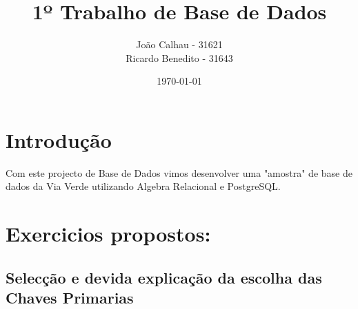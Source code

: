 \documentclass[a4paper]{article}
\title{1º Trabalho de Base de Dados}
\author{João Calhau - 31621 \\ Ricardo Benedito - 31643}
\date{\today}
\begin{document}
\maketitle

\section{Introdução}

Com este projecto de Base de Dados vimos desenvolver uma "amostra" de base de dados da Via Verde utilizando Algebra Relacional e PostgreSQL.

\newpage

\section{Exercicios propostos:}

\subsection{Selecção e devida explicação da escolha das Chaves Primarias}
\end{document}
